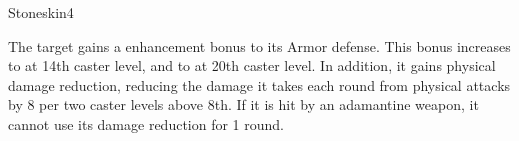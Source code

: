 \begin{spellsection}{Stoneskin}{4}
\begin{spellheader}
    \begin{spelltargetinginfo}
    \end{spelltargetinginfo}
\end{spellheader}
\begin{spellcontent}
    \begin{spelleffects}
        \spelleffect The target gains a  enhancement bonus to its Armor defense. This bonus increases to  at 14th caster level, and to  at 20th caster level. In addition, it gains physical damage reduction, reducing the damage it takes each round from physical attacks by 8  per two caster levels above 8th. If it is hit by an adamantine weapon, it cannot use its damage reduction for 1 round.
        \spelldur \durshort
    \end{spelleffects}
\end{spellcontent}
\begin{spellfooter}
\end{spellfooter}
\end{spellsection}


